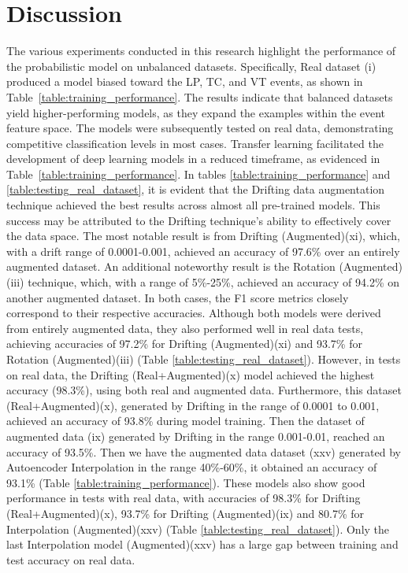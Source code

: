 \documentclass[lettersize,journal]{IEEEtran}
\begin{document}
\section{Discussion}\label{discussion}
\noindent The various experiments conducted in this research highlight the performance of the probabilistic model on unbalanced datasets. Specifically, Real dataset (i) produced a model biased toward the LP, TC, and VT events, as shown in Table~\ref{table:training_performance}.
The results indicate that balanced datasets yield higher-performing models, as they expand the examples within the event feature space. The models were subsequently tested on real data, demonstrating competitive classification levels in most cases. Transfer learning facilitated the development of deep learning models in a reduced timeframe, as evidenced in Table~\ref{table:training_performance}.
In tables \ref{table:training_performance} and \ref{table:testing_real_dataset}, it is evident that the Drifting data augmentation technique achieved the best results across almost all pre-trained models. This success may be attributed to the Drifting technique's ability to effectively cover the data space. The most notable result is from Drifting (Augmented)(xi), which, with a drift range of 0.0001-0.001, achieved an accuracy of 97.6\% over an entirely augmented dataset. An additional noteworthy result is the Rotation (Augmented)(iii) technique, which, with a range of 5\%-25\%, achieved an accuracy of 94.2\% on another augmented dataset.
In both cases, the F1 score metrics closely correspond to their respective accuracies. Although both models were derived from entirely augmented data, they also performed well in real data tests, achieving accuracies of 97.2\% for Drifting (Augmented)(xi) and 93.7\% for Rotation (Augmented)(iii) (Table \ref{table:testing_real_dataset}). However, in tests on real data, the Drifting (Real+Augmented)(x) model achieved the highest accuracy (98.3\%), using both real and augmented data. Furthermore, this dataset (Real+Augmented)(x), generated by Drifting in the range of 0.0001 to 0.001, achieved an accuracy of 93.8\% during model training. Then the dataset of augmented data (ix) generated by Drifting in the range 0.001-0.01, reached an accuracy of 93.5\%. Then we have the augmented data dataset (xxv) generated by Autoencoder Interpolation in the range 40\%-60\%, it obtained an accuracy of 93.1\% (Table \ref{table:training_performance}). These models also show good performance in tests with real data, with accuracies of 98.3\% for Drifting (Real+Augmented)(x), 93.7\% for Drifting (Augmented)(ix) and 80.7\% for Interpolation (Augmented)(xxv) (Table \ref{table:testing_real_dataset}). Only the last Interpolation model (Augmented)(xxv) has a large gap between training and test accuracy on real data.
\end{document}
